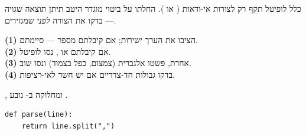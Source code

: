\begin{warnbox}
כלל לופיטל תקף רק לצורות אי-ודאות ( או \en{$\infty/\infty$}). החלתו על ביטוי
מוגדר היטב תיתן תוצאה שגויה — בדקו את הצורה \emph{לפני} שמגזירים.
\end{warnbox}

\begin{keybox}[frametitle={ארבעה צעדים לחישוב גבול}]
\textbf{(1)} הציבו את הערך ישירות; אם קיבלתם מספר — סיימתם.\\
\textbf{(2)} אם קיבלתם  או \en{$\infty/\infty$}, נסו לופיטל.\\
\textbf{(3)} אחרת, פשטו אלגברית (צמצום, כפל בצמוד) ונסו שוב.\\
\textbf{(4)} בדקו גבולות חד-צדדיים אם יש חשד לאי-רציפות.
\end{keybox}

\begin{notebox}[nobreak=true,frametitle={זהות שימושית}]
{\small {}, ומחלוקה ב-\en{$\cos^2\theta$} נובע
.
}
\end{notebox}

\begin{codebox}[nobreak=true,frametitle={\code{parser.py}}]
\begin{asmblock}
\begin{lstlisting}[style=pystyle]
def parse(line):
    return line.split(",")
\end{lstlisting}
\end{asmblock}
\end{codebox}


